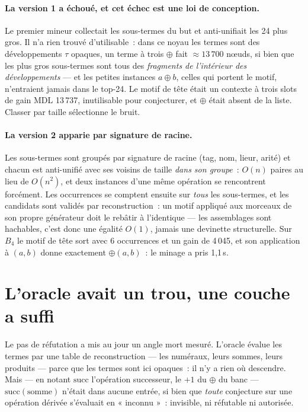 \documentclass[11pt]{article}
\theoremstyle{remark}\newtheorem{remarque}{Remarque}
\begin{document}
\paragraph{La version 1 a échoué, et cet échec est une loi de conception.}
Le premier mineur collectait les sous-termes du but et anti-unifiait les 24
plus gros. Il n'a rien trouvé d'utilisable~: dans ce noyau les termes sont
des développements $\tau$ opaques, un terme à trois $\oplus$ fait
${\approx}13\,700$ nœuds, si bien que les plus gros sous-termes sont tous des
\emph{fragments de l'intérieur des développements} --- et les petites
instances $a \oplus b$, celles qui portent le motif, n'entraient jamais dans
le top-24. Le motif de tête était un contexte à trois slots de gain MDL
13\,737, inutilisable pour conjecturer, et $\oplus$ était absent de la liste.
Classer par taille sélectionne le bruit.

\paragraph{La version 2 apparie par signature de racine.} Les sous-termes
sont groupés par signature de racine (tag, nom, lieur, arité) et chacun est
anti-unifié avec ses voisins de taille \emph{dans son groupe}~: $O(n)$ paires
au lieu de $O(n^2)$, et deux instances d'une même opération se rencontrent
forcément. Les occurrences se comptent ensuite sur \emph{tous} les
sous-termes, et les candidats sont validés par reconstruction~: un motif
appliqué aux morceaux de son propre générateur doit le rebâtir à l'identique
--- les assemblages sont hachables, c'est donc une égalité $O(1)$, jamais une
devinette structurelle. Sur $B_4$ le motif de tête sort avec 6 occurrences et
un gain de 4\,045, et son application à $(a,b)$ donne exactement
$\oplus(a,b)$~: le minage a pris 1,1\,s.

\section{L'oracle avait un trou, une couche a suffi}
\label{sec:oracle}

Le pas de réfutation a mis au jour un angle mort mesuré. L'oracle évalue les
termes par une table de reconstruction --- les numéraux, leurs sommes, leurs
produits --- parce que les termes sont ici opaques~: il n'y a rien où
descendre. Mais --- en notant $\mathrm{succ}$ l'opération successeur, le
$+1$ du $\oplus$ du banc --- $\mathrm{succ}(\text{somme})$ n'était dans
aucune entrée, si bien que \emph{toute} conjecture sur une opération dérivée s'évaluait en
« inconnu »~: invisible, ni réfutable ni autorisée.
\end{document}
